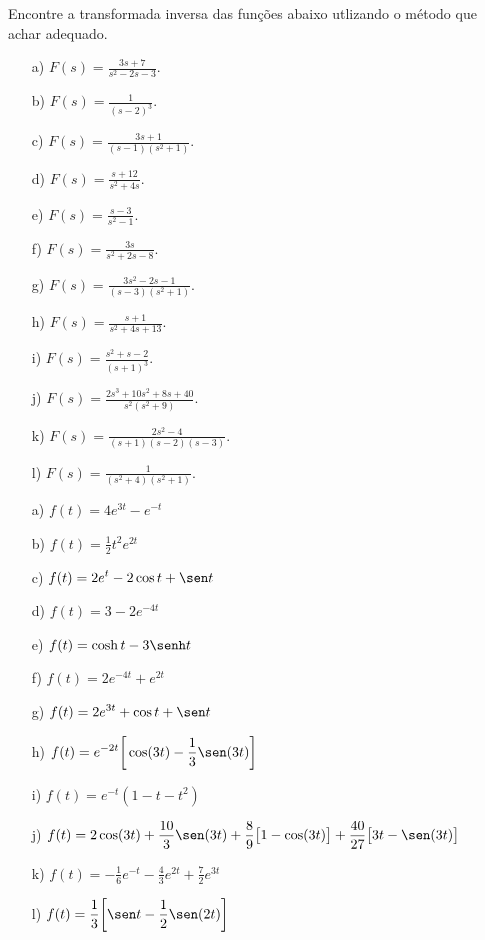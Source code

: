 \begin{exer}
Encontre a transformada inversa das funções abaixo utlizando o método que achar adequado.
\begin{itemize}
\item[a)] $\displaystyle F(s)= \frac{3s + 7}{s^2 - 2 s - 3}$.
\item[b)] $\displaystyle F(s)= \frac{1}{(s-2)^3}$.
\item[c)] $\displaystyle F(s)= \frac{3s + 1}{(s-1)(s^2 +1)}$.
\item[d)] $\displaystyle F(s)= \frac{s + 12}{s^2 +4s}$.
\item[e)] $\displaystyle F(s)= \frac{s -3}{s^2 -1}$.
\item[f)] $\displaystyle F(s)= \frac{3s}{s^2 +2s -8}$.
\item[g)] $\displaystyle F(s)= \frac{3s^2 -2s - 1}{(s-3)(s^2 +1)}$.
\item[h)] $\displaystyle F(s)= \frac{s + 1}{s^2 +4s +13}$.
\item[i)] $\displaystyle F(s)= \frac{s^2 + s -2}{(s +1)^3}$.
\item[j)] $\displaystyle F(s)= \frac{2s^3 +10s^2+8s+40}{s^2(s^2 +9)}$.
\item[k)] $\displaystyle F(s)= \frac{2s^2 -4}{(s+1)(s-2)(s-3)}$.
\item[l)] $\displaystyle F(s)= \frac{1}{(s^2+4)(s^2 +1)}$.
\end{itemize}
\end{exer}
\begin{resp}
\begin{itemize}
  \item[a)] $\displaystyle f(t) = 4e^{3t} - e^{-t}$
  \item[b)] $\displaystyle f(t) = \frac{1}{2} t^2 e^{2t}$
  \item[c)] $\displaystyle f(t) = 2e^{t} - 2 \cos t + \sen t$
  \item[d)] $\displaystyle f(t) = 3 -2 e^{-4t}$
  \item[e)] $\displaystyle f(t) = \cosh t - 3 \senh t$
  \item[f)] $\displaystyle f(t) = 2e^{-4t} + e^{2t}$
  \item[g)] $\displaystyle f(t) = 2e^{3t} + \cos t + \sen t$
  \item[h)] $\displaystyle f(t) = e^{-2t}\bigg[ \cos(3t) - \frac{1}{3} \sen (3t) \bigg]$
  \item[i)] $\displaystyle f(t) = e^{-t}(1-t-t^2)$
  \item[j)] $\displaystyle f(t) = 2\cos(3t) +\frac{10}{3} \sen(3t) +\frac{8}{9} \big[1-\cos(3t)\big] + \frac{40}{27} \big[3t - \sen(3t)\big]$
  \item[k)] $\displaystyle f(t) = -\frac{1}{6} e^{-t} -\frac{4}{3} e^{2t} + \frac{7}{2} e^{3t}$
  \item[l)] $\displaystyle f(t) = \frac{1}{3} \bigg[ \sen t - \frac{1}{2}\sen(2t) \bigg]$
\end{itemize}
\end{resp}






